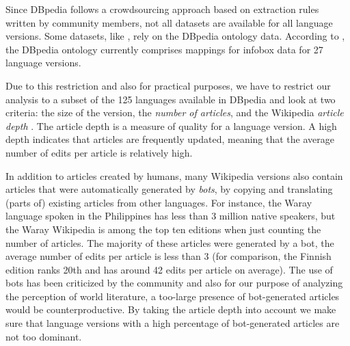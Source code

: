 \documentclass[a4paper,12pt]{scrartcl}
\begin{document}
Since DBpedia follows a crowdsourcing approach based on extraction
rules written by community members, not all datasets are
available for all language versions. Some datasets, like
, rely on the DBpedia ontology data. According
to \cite{lehmann2014dbpediaKnowledgeBase}, the DBpedia ontology
currently comprises mappings for infobox data for 27 language
versions.

%
%
Due to this restriction and also for practical purposes, we have to
restrict our analysis to a subset of the 125 languages available in
DBpedia and look at two criteria: the size of the version, \ie
the \emph{number of articles}, and the Wikipedia \emph{article
  depth} \cite{wikipediarticledepth}. %
The article depth is a measure of quality for a language version. A
high depth indicates that articles are frequently updated, meaning
that the average number of edits per article is relatively high.
%

In addition to articles created by humans, many Wikipedia versions
also contain articles that were automatically generated by
\emph{bots}, \eg by copying and translating (parts of) existing
articles from other languages. For instance, the Waray language spoken
in the Philippines has less than 3 million native speakers, but the
Waray Wikipedia
\cite{wp:waray} %
is among the top ten editions when just counting the number of
articles. The majority of these articles were generated by a bot, the
average number of edits per article is less than 3 (for comparison,
the Finnish edition ranks 20th and has around 42 edits per article on
average).
%
The use of bots has been criticized by the community \cite{bots:digitopoly,steiner2014bots} %
%
and also for our purpose of analyzing the perception of world
literature, a too-large presence of bot-generated articles
would be counterproductive.
%
By taking the article depth into account we make sure that language
versions with a high percentage of bot-generated articles are not too
dominant.
\end{document}
